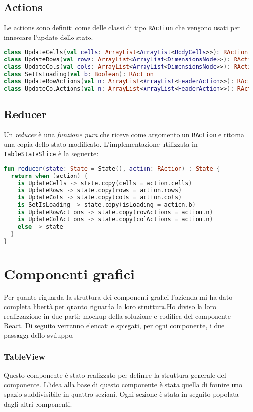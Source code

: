 \subsection{Actions}
Le actions sono definiti come delle classi di tipo \verb|RAction| che vengono usati per innescare l'update dello stato.

\begin{lstlisting}[caption={Actions}, label={lst:bodycells}, language=Kotlin]
class UpdateCells(val cells: ArrayList<ArrayList<BodyCells>>): RAction
class UpdateRows(val rows: ArrayList<ArrayList<DimensionsNode>>): RAction
class UpdateCols(val cols: ArrayList<ArrayList<DimensionsNode>>): RAction
class SetIsLoading(val b: Boolean): RAction
class UpdateRowActions(val n: ArrayList<ArrayList<HeaderAction>>): RAction
class UpdateColActions(val n: ArrayList<ArrayList<HeaderAction>>): RAction
\end{lstlisting}

\subsection{Reducer}
Un \emph{reducer} è una \emph{funzione pura} che riceve come argomento un \verb|RAction| e ritorna una copia dello stato modificato. L'implementazione utilizzata in \verb|TableStateSlice| è la seguente:
\begin{lstlisting}[caption={Reducer}, label={lst:bodycells}, language=Kotlin]
fun reducer(state: State = State(), action: RAction) : State {
  return when (action) {
    is UpdateCells -> state.copy(cells = action.cells)
    is UpdateRows -> state.copy(rows = action.rows)
    is UpdateCols -> state.copy(cols = action.cols)
    is SetIsLoading -> state.copy(isLoading = action.b)
    is UpdateRowActions -> state.copy(rowActions = action.n)
    is UpdateColActions -> state.copy(colActions = action.n)
    else -> state
  }
}
\end{lstlisting}

\section{Componenti grafici}
Per quanto riguarda la struttura dei componenti grafici l'azienda mi ha dato completa libertà per quanto riguarda la loro struttura.Ho diviso la loro realizzazione in due parti: mockup della soluzione e codifica del componente React. Di seguito verranno elencati e spiegati, per ogni componente, i due passaggi dello sviluppo.

\subsubsection{TableView}
Questo componente è stato realizzato per definire la struttura generale del componente. L'idea alla base di questo componente è stata quella di fornire uno spazio suddivisibile in quattro sezioni. Ogni sezione è stata in seguito popolata dagli altri componenti.

